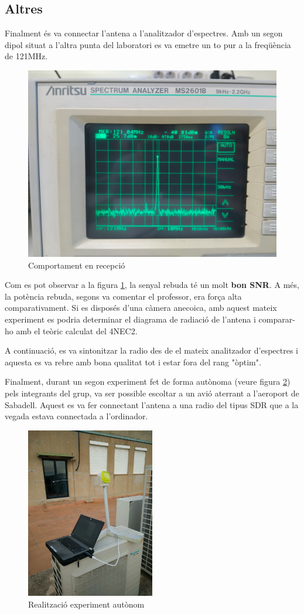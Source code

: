 \subsection{Altres}
Finalment és va connectar l'antena a l'analitzador d'espectres. Amb un segon dipol situat a l'altra punta del laboratori es va emetre un to pur a la freqüència de 121MHz.
\begin{figure}[H]
	\centering
	\includegraphics[width=\textwidth]{./images/Mesures/5recepcio.jpg}
	\caption{Comportament en recepció}
	\label{RX}
\end{figure}
Com es pot observar a la figura \ref{RX}, la senyal rebuda té un molt \textbf{bon SNR}. A més, la potència rebuda, segons va comentar el professor, era força alta comparativament. Si es disposés d'una càmera anecoica, amb aquest mateix experiment es podria determinar el diagrama de radiació de l'antena i comparar-ho amb el teòric calculat del 4NEC2.

A continuació, es va sintonitzar la radio des de el mateix analitzador d'espectres i aquesta es va rebre amb bona qualitat tot i estar fora del rang "òptim". 

Finalment, durant un segon experiment fet de forma autònoma (veure figura \ref{ExpAutonom}) pels integrants del grup, va ser possible escoltar a un avió aterrant a l'aeroport de Sabadell. Aquest es va fer connectant l'antena a una radio del tipus SDR que a la vegada estava connectada a l'ordinador.

\begin{figure}[H]
	\centering
	\includegraphics[width=0.5\textwidth]{./images/Mesures/Exp_autonom_1.jpg}
	\caption{Realització experiment autònom}
	\label{ExpAutonom}
\end{figure}